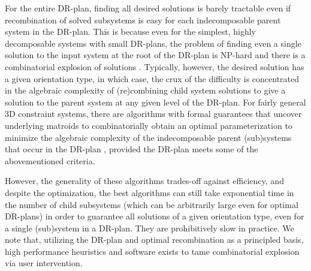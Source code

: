 \medskip\noindent
{}
For the entire DR-plan, finding all desired solutions is barely tractable even if recombination of solved subsystems is easy for each indecomposable parent system in the DR-plan. This is because even for the simplest, highly decomposable systems with small DR-plans, the problem of finding even a single solution to the input system at the root of the DR-plan is NP-hard  \cite{saxe1979embeddability} and there is a combinatorial explosion of solutions \cite{borcea2004number}. Typically, however, the desired solution has a given orientation type, in which case, the crux of the difficulty is concentrated in the algebraic complexity of (re)combining child system solutions to give a solution to the parent system at any given level of the DR-plan. For fairly general 3D constraint systems, there are algorithms with formal guarantees that uncover underlying matroids to combinatorially obtain an optimal parameterization to minimize the algebraic complexity of the indecomposable parent (sub)systems that occur in the DR-plan \cite{sitharam2010optimized,sitharam2006well,sitharam2010reconciling}, provided the DR-plan meets some of the abovementioned criteria.

However, the generality of these algorithms trades-off against efficiency, and despite the optimization, the best algorithms can still take exponential time in the number of child subsystems (which can be arbitrarily large even for optimal DR-plans) in order to guarantee all solutions of a given orientation type, even for a single (sub)system in a DR-plan. They are prohibitively slow in practice. We note that, utilizing the DR-plan and optimal recombination as a principled basis, high performance heuristics and software exists \cite{sitharam2006solution} to tame combinatorial explosion via user intervention.


